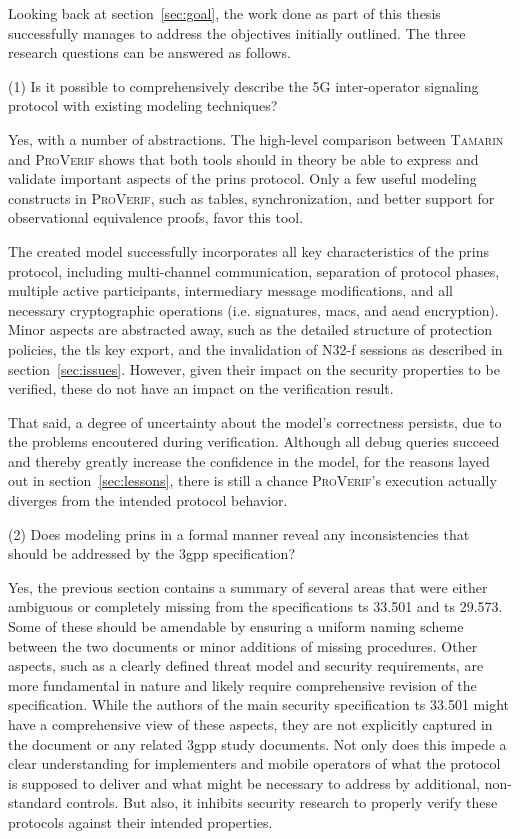 Looking back at section~\ref{sec:goal}, the work done as part of this thesis successfully manages to address the objectives initially outlined.
The three research questions can be answered as follows.\bigskip

\noindent
(1) Is it possible to comprehensively describe the 5G inter-operator signaling protocol with existing modeling techniques?

Yes, with a number of abstractions.
The high-level comparison between \textsc{Tamarin} and \textsc{ProVerif} shows that both tools should in theory be able to express and validate important aspects of the \gls{prins} protocol.
Only a few useful modeling constructs in \textsc{ProVerif}, such as tables, synchronization, and better support for observational equivalence proofs, favor this tool.

The created model successfully incorporates all key characteristics of the \gls{prins} protocol, including multi-channel communication, separation of protocol phases, multiple active participants, intermediary message modifications, and all necessary cryptographic operations (i.e. signatures, \glspl{mac}, and \gls{aead} encryption).
Minor aspects are abstracted away, such as the detailed structure of protection policies, the \gls{tls} key export, and the invalidation of N32-f sessions as described in section~\ref{sec:issues}.
However, given their impact on the security properties to be verified, these do not have an impact on the verification result.

That said, a degree of uncertainty about the model's correctness persists, due to the problems encoutered during verification.
Although all debug queries succeed and thereby greatly increase the confidence in the model, for the reasons layed out in section~\ref{sec:lessons}, there is still a chance \textsc{ProVerif}'s execution actually diverges from the intended protocol behavior.\bigskip

\noindent
(2) Does modeling \gls{prins} in a formal manner reveal any inconsistencies that should be addressed by the \gls{3gpp} specification?

Yes, the previous section contains a summary of several areas that were either ambiguous or completely missing from the specifications \gls{ts} 33.501 and \gls{ts} 29.573.
Some of these should be amendable by ensuring a uniform naming scheme between the two documents or minor additions of missing procedures.
Other aspects, such as a clearly defined threat model and security requirements, are more fundamental in nature and likely require comprehensive revision of the specification.
While the authors of the main security specification \gls{ts} 33.501 might have a comprehensive view of these aspects, they are not explicitly captured in the document or any related \gls{3gpp} study documents.
Not only does this impede a clear understanding for implementers and mobile operators of what the protocol is supposed to deliver and what might be necessary to address by additional, non-standard controls.
But also, it inhibits security research to properly verify these protocols against their intended properties.


